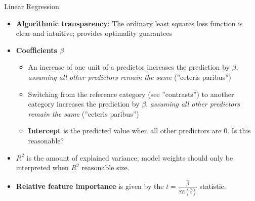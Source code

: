 \documentclass[ignorenonframetext,xcolor=x11names]{beamer}
\begin{document}
\begin{frame}[label=full]{Linear Regression}
\begin{itemize}
   \item \textbf{Algorithmic transparency}: The ordinary least squares loss function is clear and intuitive; provides optimality guarantees
   \item \textbf{Coefficients $\beta$}
   \begin{itemize}
      \item An increase of one unit of a predictor increases the prediction by $\beta$, \emph{assuming all other predictors remain the same} (''ceteris paribus'')
      \item Switching from the reference category (see ''contrasts'') to another category increases the prediction by $\beta$, \emph{assuming all other predictors remain the same} (''ceteris paribus'')
      \item \textbf{Intercept} is the predicted value when all other predictors are 0. Is this reasonable?
   \end{itemize}
   \item $R^2$ is the amount of explained variance; model weights should only be interpreted when $R^2$ reasonable size.
   \item \textbf{Relative feature importance} is given by the $t=\frac{\hat{\beta}}{SE(\hat{\beta})}$ statistic.
\end{itemize}
\end{frame}


\end{document}
